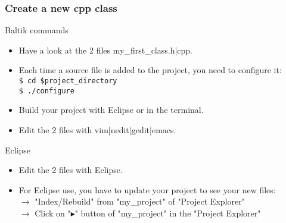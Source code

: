 \documentclass[10pt, hyperref={unicode=true,pdfusetitle, bookmarks=true,bookmarksnumbered=false,bookmarksopen=false, breaklinks=false,pdfborder={0 0 1},backref=true,colorlinks=true,linkcolor=darkblue,pageanchor, urlcolor=darkblue}]{beamer}
\begin{document}
\begin{frame}
\frametitle{Create a new cpp class}

\begin{block}{Baltik commands}
\begin{itemize}
\item Have a look at the 2 files my\_first\_class.h|cpp.\\

\item Each time a source file is added to the project, you need to configure it:\\
\texttt{\$ cd \$project\_directory}\\
\texttt{\$ ./configure}

\item Build your project with Eclipse or in the terminal.

\item Edit the 2 files with vim|nedit|gedit|emacs.
\end{itemize}
\end{block}

\begin{exampleblock}{Eclipse}
\begin{itemize}
\item Edit the 2 files with Eclipse.

\item For Eclipse use, you have to update your project to see your new files:\\
$\rightarrow$ "Index/Rebuild" from "my\_project" of "Project Explorer"\\
$\rightarrow$ Click on "$\blacktriangleright$" button of "my\_project" in the "Project Explorer"

\end{itemize}
\end{exampleblock}
\end{frame}
\end{document}
